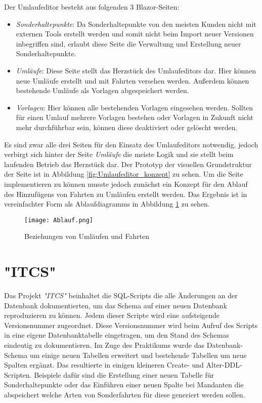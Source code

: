     Der Umlaufeditor besteht aus folgenden 3 Blazor-Seiten: 
    \begin{itemize}
        \item \emph{Sonderhaltepunkte}: Da Sonderhaltepunkte von den meisten Kunden nicht mit externen Tools erstellt werden und somit nicht beim Import neuer Versionen inbegriffen sind, 
                erlaubt diese Seite die Verwaltung und Erstellung neuer Sonderhaltepunkte.
        \item \emph{Umläufe}: Diese Seite stellt das Herzstück des Umlaufeditors dar. Hier können neue Umläufe erstellt und mit Fahrten versehen werden. Außerdem können bestehende Umläufe 
                als Vorlagen abgespeichert werden. 
        \item \emph{Vorlagen}: Hier können alle bestehenden Vorlagen eingesehen werden. Sollten für einen Umlauf mehrere Vorlagen bestehen oder Vorlagen in Zukunft nicht mehr durchführbar sein, können diese
                deaktiviert oder gelöscht werden.
    \end{itemize}

    Es sind zwar alle drei Seiten für den Einsatz des Umlaufeditors notwendig, jedoch verbirgt sich hinter der Seite \emph{Umläufe} die meiste Logik und sie stellt beim laufenden Betrieb das Herzstück dar.
    Der Prototyp der visuellen Grundstruktur der Seite ist in Abbildung \ref{fig:Umlaufeditor_konzept} zu sehen. Um die Seite implementieren zu können musste jedoch zunächst ein Konzept für den Ablauf 
    des Hinzufügens von Fahrten zu Umläufen erstellt werden. Das Ergebnis ist in vereinfachter Form als Ablaufdiagramms in Abbildung \ref{fig:Ablauf} zu sehen.

    \begin{figure}[H]
        \centering
        \texttt{[image: Ablauf.png]}
        \caption{Beziehungen von Umläufen und Fahrten}
        \label{fig:Ablauf}
    \end{figure}

     
\section{"ITCS"}\label{sec:itcs-design}
    Das Projekt \emph{"ITCS"} beinhaltet die SQL-Scripts die alle Änderungen an der Datenbank dokumentierten, um das Schema auf einer neuen Datenbank reproduzieren zu können. 
    Jedem dieser Scripte wird eine aufsteigende Versionsnummer zugeordnet. Diese Versionsnummer wird beim Aufruf des Scripts in eine eigene Datenbanktabelle eingetragen, um den Stand des Schemas
    eindeutig zu dokumentieren. Im Zuge des Praktikums wurde das Datenbank-Schema um einige neuen Tabellen erweitert und bestehende Tabellen um neue Spalten ergänzt. Das resultierte in
    einigen kleineren Create- und Alter-DDL-Scripten. Beispiele dafür sind die Erstellung einer neuen Tabelle für Sonderhaltepunkte oder das Einführen einer neuen Spalte bei Mandanten 
    die abspeichert welche Arten von Sonderfahrten für diese generiert werden sollen.


